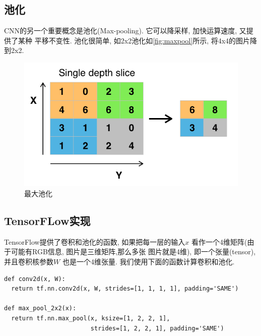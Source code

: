 \documentclass{ctexart}
\begin{document}
\subsection{池化}
CNN的另一个重要概念是池化(Max-pooling).
它可以降采样, 加快运算速度, 又提供了某种
平移不变性. 池化很简单, 如2x2池化如\autoref{fig:maxpool}所示,
将4x4的图片降到2x2.
\begin{figure}[htb]
  \centering
  \includegraphics[width=.8\textwidth]{Max_pooling}
  \caption{最大池化}
  \label{fig:maxpool}
\end{figure}

\subsection{TensorFLow实现}
TensorFlow提供了卷积和池化的函数, 如果把每一层的输入\(x\)
看作一个4维矩阵(由于可能有RGB信息, 图片是三维矩阵,那么多张
图片就是4维), 即一个张量(tensor), 并且卷积核参数\(W\)
也是一个4维张量. 我们使用下面的函数计算卷积和池化.
\begin{lstlisting}
def conv2d(x, W):
  return tf.nn.conv2d(x, W, strides=[1, 1, 1, 1], padding='SAME')

def max_pool_2x2(x):
  return tf.nn.max_pool(x, ksize=[1, 2, 2, 1],
                        strides=[1, 2, 2, 1], padding='SAME')
\end{lstlisting}
\end{document}
